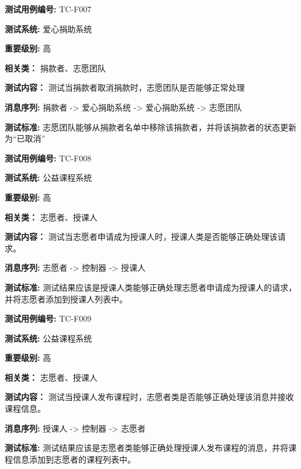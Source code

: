 \begin{framed} \textbf{测试用例编号:} TC-F007

\textbf{测试系统:} 爱心捐助系统

\textbf{重要级别:} 高

\textbf{相关类：} 捐款者、志愿团队

\textbf{测试内容：} 测试当捐款者取消捐款时，志愿团队是否能够正常处理

\textbf{消息序列:} 捐款者 -> 爱心捐助系统 -> 爱心捐助系统 -> 志愿团队

\textbf{测试标准:} 志愿团队能够从捐款者名单中移除该捐款者，并将该捐款者的状态更新为“已取消”

\begin{center}  \end{center} \end{framed}

\begin{framed} \textbf{测试用例编号:} TC-F008

\textbf{测试系统:} 公益课程系统

\textbf{重要级别:} 高

\textbf{相关类：} 志愿者、授课人

\textbf{测试内容：} 测试当志愿者申请成为授课人时，授课人类是否能够正确处理该请求。

\textbf{消息序列:} 志愿者 -> 控制器 -> 授课人

\textbf{测试标准:} 测试结果应该是授课人类能够正确处理志愿者申请成为授课人的请求，并将志愿者添加到授课人列表中。

\begin{center}  \end{center} \end{framed}

\begin{framed} \textbf{测试用例编号:} TC-F009

\textbf{测试系统:} 公益课程系统

\textbf{重要级别:} 高

\textbf{相关类：} 志愿者、授课人

\textbf{测试内容：} 测试当授课人发布课程时，志愿者类是否能够正确处理该消息并接收课程信息。

\textbf{消息序列:} 授课人 -> 控制器 -> 志愿者

\textbf{测试标准:} 测试结果应该是志愿者类能够正确处理授课人发布课程的消息，并将课程信息添加到志愿者的课程列表中。

\begin{center}  \end{center} \end{framed}

